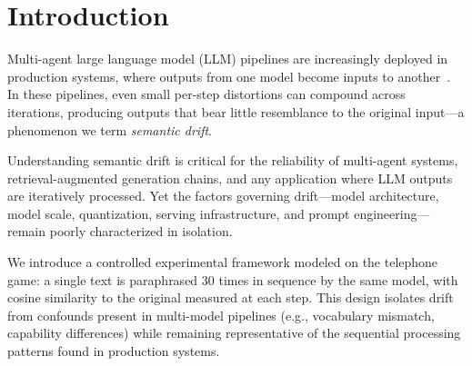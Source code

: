 \documentclass[11pt]{article}
\begin{document}
\begin{abstract}
(5)~KV-cache precision and temperature effects that are directionally mixed
and small for stable models, while below the threshold low temperature
raises the runaway rate to 100\% of chains; and
(6)~system-prompt effects that range from invisible (spread $<0.01$ on the
most stable cross-family model) to dominant (spreads of 0.3--0.7 within the
Qwen3.5 family), with prompt rankings that transfer between some
configurations ($\rho$ up to 0.83) and not others ($\rho\approx0$ against the
control model).
Fixing the sampling seed does not reproduce a chain on any of these stacks,
so all statistics are reported over independent samples with bootstrap
intervals. The similarity metric is validated against a second embedding
model on both datasets ($r=0.96$ and $0.83$).
\end{abstract}

\section{Introduction}
\label{sec:intro}

Multi-agent large language model (LLM) pipelines are increasingly deployed in
production systems, where outputs from one model become inputs to
another~\citep{rath2026agent}. In these pipelines, even small per-step distortions
can compound across iterations, producing outputs that bear little resemblance
to the original input---a phenomenon we term \emph{semantic drift}.

Understanding semantic drift is critical for the reliability of multi-agent systems,
retrieval-augmented generation chains, and any application where LLM outputs are
iteratively processed. Yet the factors governing drift---model architecture,
model scale, quantization, serving infrastructure, and prompt engineering---remain
poorly characterized in isolation.

We introduce a controlled experimental framework modeled on the telephone game:
a single text is paraphrased 30 times in sequence by the same model, with cosine
similarity to the original measured at each step. This design isolates drift from
confounds present in multi-model pipelines (e.g., vocabulary mismatch, capability
differences) while remaining representative of the sequential processing patterns
found in production systems.
\end{document}
